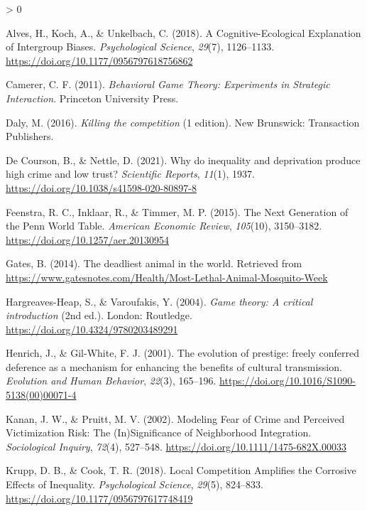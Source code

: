 \documentclass[
  english,
  man]{apa6}
\newlength{\cslhangindent}
\newenvironment{CSLReferences}[2] %
 {%
  \setlength{\parindent}{0pt}
  \ifodd #1 \everypar{\setlength{\hangindent}{\cslhangindent}}\ignorespaces\fi
  \ifnum #2 > 0
  \setlength{\parskip}{#2\baselineskip}
  \fi
 }%
 {}
\begin{document}
\hypertarget{refs}{}
\begin{CSLReferences}{1}{0}
\leavevmode\hypertarget{ref-alves2018}{}%
Alves, H., Koch, A., \& Unkelbach, C. (2018). A Cognitive-Ecological Explanation of Intergroup Biases. \emph{Psychological Science}, \emph{29}(7), 1126--1133. \url{https://doi.org/10.1177/0956797618756862}

\leavevmode\hypertarget{ref-camerer2011}{}%
Camerer, C. F. (2011). \emph{Behavioral Game Theory: Experiments in Strategic Interaction}. Princeton University Press.

\leavevmode\hypertarget{ref-daly2016}{}%
Daly, M. (2016). \emph{Killing the competition} (1 edition). New Brunswick: Transaction Publishers.

\leavevmode\hypertarget{ref-decourson2021}{}%
De Courson, B., \& Nettle, D. (2021). Why do inequality and deprivation produce high crime and low trust? \emph{Scientific Reports}, \emph{11}(1), 1937. \url{https://doi.org/10.1038/s41598-020-80897-8}

\leavevmode\hypertarget{ref-feenstra2015}{}%
Feenstra, R. C., Inklaar, R., \& Timmer, M. P. (2015). The Next Generation of the Penn World Table. \emph{American Economic Review}, \emph{105}(10), 3150--3182. \url{https://doi.org/10.1257/aer.20130954}

\leavevmode\hypertarget{ref-gates2014}{}%
Gates, B. (2014). The deadliest animal in the world. Retrieved from \url{https://www.gatesnotes.com/Health/Most-Lethal-Animal-Mosquito-Week}

\leavevmode\hypertarget{ref-hargreaves-heap2004}{}%
Hargreaves-Heap, S., \& Varoufakis, Y. (2004). \emph{Game theory: A critical introduction} (2nd ed.). London: Routledge. \url{https://doi.org/10.4324/9780203489291}

\leavevmode\hypertarget{ref-henrich2001}{}%
Henrich, J., \& Gil-White, F. J. (2001). The evolution of prestige: freely conferred deference as a mechanism for enhancing the benefits of cultural transmission. \emph{Evolution and Human Behavior}, \emph{22}(3), 165--196. \url{https://doi.org/10.1016/S1090-5138(00)00071-4}

\leavevmode\hypertarget{ref-kanan2002}{}%
Kanan, J. W., \& Pruitt, M. V. (2002). Modeling Fear of Crime and Perceived Victimization Risk: The (In)Significance of Neighborhood Integration. \emph{Sociological Inquiry}, \emph{72}(4), 527--548. \url{https://doi.org/10.1111/1475-682X.00033}

\leavevmode\hypertarget{ref-krupp2018}{}%
Krupp, D. B., \& Cook, T. R. (2018). Local Competition Amplifies the Corrosive Effects of Inequality. \emph{Psychological Science}, \emph{29}(5), 824--833. \url{https://doi.org/10.1177/0956797617748419}


\end{CSLReferences}
\end{document}
